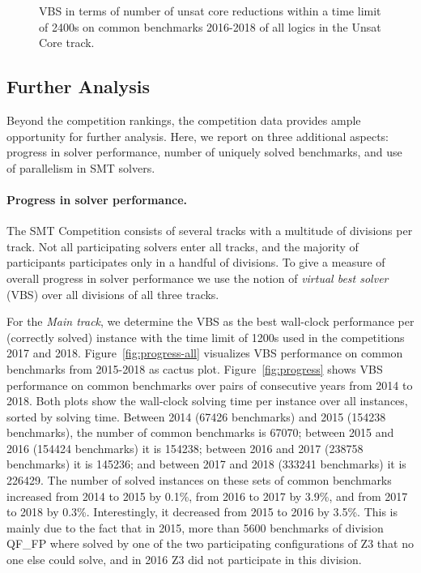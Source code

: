 \documentclass[dvipsnames,table,twoside,11pt]{article}
\begin{document}
\begin{figure}
  \centering
  \vspace{-5ex}
  \caption{VBS in terms of number of unsat core reductions
  within a time limit of 2400s
  on common benchmarks 2016-2018 of all logics in the Unsat Core 
  track.}
  \label{fig:progress-all-uc}
\end{figure}

\subsection{Further Analysis}

Beyond the competition rankings, the competition data provides ample
opportunity for further analysis.  Here, we report on three additional
aspects: progress in solver performance, number of uniquely solved
benchmarks, and use of parallelism in SMT solvers.

\paragraph{Progress in solver performance.}

The SMT Competition consists of several tracks with a multitude of divisions
per track.
Not all participating solvers enter all tracks, and the majority of
participants participates only in a handful of divisions.
To give a measure of overall progress in solver performance we
use the notion of \emph{virtual best solver} (VBS) over all divisions of all
three tracks.

For the \emph{Main track}, we determine the VBS as the best wall-clock
performance per (correctly solved) instance with the time limit of 1200s used
in the competitions 2017 and 2018. Figure~\ref{fig:progress-all} visualizes VBS
performance on common benchmarks from 2015-2018 as cactus plot.
Figure~\ref{fig:progress} shows VBS performance on common benchmarks over pairs
of consecutive years from 2014 to 2018.  Both plots show the wall-clock solving
time per instance over all instances, sorted by solving time.
%
Between 2014 (67426 benchmarks) and 2015 (154238 benchmarks),
the number of common benchmarks is 67070;
between 2015 and 2016 (154424 benchmarks) it is 154238;
between 2016 and 2017 (238758 benchmarks) it is 145236;
and between 2017 and 2018 (333241 benchmarks) it is 226429.
The number of solved instances on these sets of common benchmarks
increased from 2014 to 2015 by 0.1\%, from 2016 to 2017 by 3.9\%,
and from 2017 to 2018 by 0.3\%.
Interestingly, it decreased from 2015 to 2016 by 3.5\%.
This is mainly due to the fact that in 2015, more than 5600 benchmarks of
division QF\_FP where solved by one of the two participating configurations of
Z3 that no one else could solve, and in 2016 Z3 did not participate in this
division.
\end{document}
